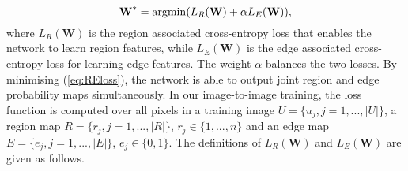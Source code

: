 \documentclass[runningheads,a4paper]{llncs}
\begin{document}
\begin{equation} \label{eq:REloss}
\textbf{W}^* = {\rm{argmin}} (L_R(\textbf{W}) + \alpha L_E(\textbf{W}) ),
\end{equation}
where $L_R(\textbf{W})$ is the region associated cross-entropy loss that enables the network to learn region features, while $L_E(\textbf{W})$ is the edge associated cross-entropy loss for learning edge features. The weight $\alpha$ balances the two losses. By minimising (\ref{eq:REloss}), the network is able to output joint region and edge probability maps simultaneously. In our image-to-image training, the loss function is computed over all pixels in a training image $U=\{u_j,j=1,...,|U|\}$, a region map $R=\{r_j,j=1,...,|R|\}$, $r_j \in \{1,...,n\}$ and an edge map $E=\{e_j,j=1,...,|E|\}$, $e_j \in \{0,1\}$. The definitions of $L_R(\textbf{W})$ and $L_E(\textbf{W})$ are given as follows.
\end{document}
